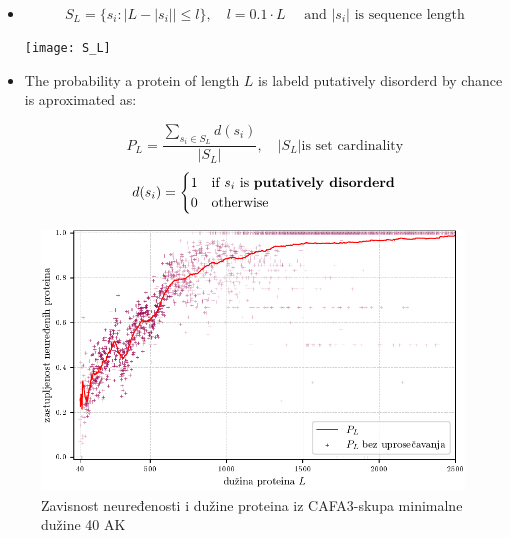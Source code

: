 \documentclass{beamer}
\newcommand{\keyword}[1]{\textbf{#1}}
\begin{document}
\begin{frame}{}
  \begin{itemize}
    \item 



  $$ S_L = \{s_i :  | L -  | s_i | | \le l  \},
  \quad l=0.1 \cdot L  \quad 
   \text{ and $|s_i|$ is sequence length}  $$

        \texttt{[image: S\_L]}

  \pause

\item

  The probability a protein of length $L$ is labeld putatively disorderd by
  chance is aproximated as:

  $$ P_L = \dfrac{ \sum_{s_i \in S_L} d(s_i)} {| S_L |}, \quad   |S_L| \text{
  is set cardinality}$$
  \[   
    d(s_i) = 
    \begin{cases}
    1 & \text{if  $s_i$ is \keyword{putatively disorderd}}\\
    0 & \text{otherwise}
    \end{cases}
  \]

  \end{itemize}
\end{frame}


\begin{frame}{}
  \begin{figure}[]
    \centering
    \includegraphics[scale=0.8]{plots/PL_F}
    \caption {
      \footnotesize Zavisnost neuređenosti i dužine proteina iz CAFA3-skupa
      minimalne dužine 40 AK
    }
  \end{figure}
\end{frame}
\end{document}
